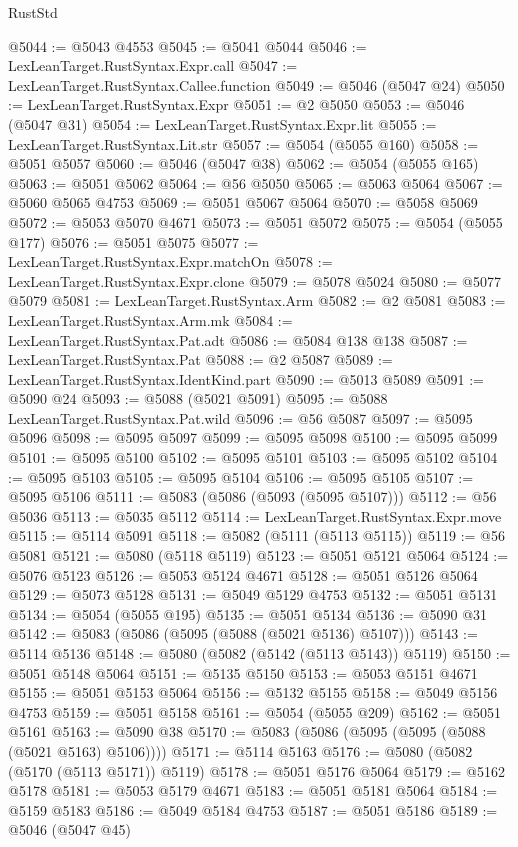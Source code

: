 \begin{lexlean}{RustStd}
\begin{coremodule}
@5044 := @5043 @4553
@5045 := @5041 @5044
@5046 := LexLeanTarget.RustSyntax.Expr.call
@5047 := LexLeanTarget.RustSyntax.Callee.function
@5049 := @5046 (@5047 @24)
@5050 := LexLeanTarget.RustSyntax.Expr
@5051 := @2 @5050
@5053 := @5046 (@5047 @31)
@5054 := LexLeanTarget.RustSyntax.Expr.lit
@5055 := LexLeanTarget.RustSyntax.Lit.str
@5057 := @5054 (@5055 @160)
@5058 := @5051 @5057
@5060 := @5046 (@5047 @38)
@5062 := @5054 (@5055 @165)
@5063 := @5051 @5062
@5064 := @56 @5050
@5065 := @5063 @5064
@5067 := @5060 @5065 @4753
@5069 := @5051 @5067 @5064
@5070 := @5058 @5069
@5072 := @5053 @5070 @4671
@5073 := @5051 @5072
@5075 := @5054 (@5055 @177)
@5076 := @5051 @5075
@5077 := LexLeanTarget.RustSyntax.Expr.matchOn
@5078 := LexLeanTarget.RustSyntax.Expr.clone
@5079 := @5078 @5024
@5080 := @5077 @5079
@5081 := LexLeanTarget.RustSyntax.Arm
@5082 := @2 @5081
@5083 := LexLeanTarget.RustSyntax.Arm.mk
@5084 := LexLeanTarget.RustSyntax.Pat.adt
@5086 := @5084 @138 @138
@5087 := LexLeanTarget.RustSyntax.Pat
@5088 := @2 @5087
@5089 := LexLeanTarget.RustSyntax.IdentKind.part
@5090 := @5013 @5089
@5091 := @5090 @24
@5093 := @5088 (@5021 @5091)
@5095 := @5088 LexLeanTarget.RustSyntax.Pat.wild
@5096 := @56 @5087
@5097 := @5095 @5096
@5098 := @5095 @5097
@5099 := @5095 @5098
@5100 := @5095 @5099
@5101 := @5095 @5100
@5102 := @5095 @5101
@5103 := @5095 @5102
@5104 := @5095 @5103
@5105 := @5095 @5104
@5106 := @5095 @5105
@5107 := @5095 @5106
@5111 := @5083 (@5086 (@5093 (@5095 @5107)))
@5112 := @56 @5036
@5113 := @5035 @5112
@5114 := LexLeanTarget.RustSyntax.Expr.move
@5115 := @5114 @5091
@5118 := @5082 (@5111 (@5113 @5115))
@5119 := @56 @5081
@5121 := @5080 (@5118 @5119)
@5123 := @5051 @5121 @5064
@5124 := @5076 @5123
@5126 := @5053 @5124 @4671
@5128 := @5051 @5126 @5064
@5129 := @5073 @5128
@5131 := @5049 @5129 @4753
@5132 := @5051 @5131
@5134 := @5054 (@5055 @195)
@5135 := @5051 @5134
@5136 := @5090 @31
@5142 := @5083 (@5086 (@5095 (@5088 (@5021 @5136) @5107)))
@5143 := @5114 @5136
@5148 := @5080 (@5082 (@5142 (@5113 @5143)) @5119)
@5150 := @5051 @5148 @5064
@5151 := @5135 @5150
@5153 := @5053 @5151 @4671
@5155 := @5051 @5153 @5064
@5156 := @5132 @5155
@5158 := @5049 @5156 @4753
@5159 := @5051 @5158
@5161 := @5054 (@5055 @209)
@5162 := @5051 @5161
@5163 := @5090 @38
@5170 := @5083 (@5086 (@5095 (@5095 (@5088 (@5021 @5163) @5106))))
@5171 := @5114 @5163
@5176 := @5080 (@5082 (@5170 (@5113 @5171)) @5119)
@5178 := @5051 @5176 @5064
@5179 := @5162 @5178
@5181 := @5053 @5179 @4671
@5183 := @5051 @5181 @5064
@5184 := @5159 @5183
@5186 := @5049 @5184 @4753
@5187 := @5051 @5186
@5189 := @5046 (@5047 @45)

\end{coremodule}
\end{lexlean}
